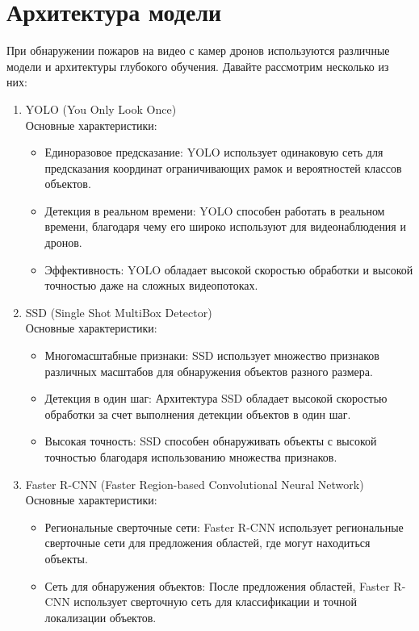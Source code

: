     \section{Архитектура модели}
    При обнаружении пожаров на видео с камер дронов используются различные модели и архитектуры глубокого обучения. Давайте рассмотрим несколько из них:
    \begin{enumerate}
        \item YOLO (You Only Look Once) \\
        Основные характеристики:
            \begin{itemize}
                \item Единоразовое предсказание: YOLO использует одинаковую сеть для предсказания координат ограничивающих рамок и вероятностей классов объектов.
                \item Детекция в реальном времени: YOLO способен работать в реальном времени, благодаря чему его широко используют для видеонаблюдения и дронов.
                \item Эффективность: YOLO обладает высокой скоростью обработки и высокой точностью даже на сложных видеопотоках.
            \end{itemize}
        \item SSD (Single Shot MultiBox Detector) \\
        Основные характеристики:
            \begin{itemize}
                \item Многомасштабные признаки: SSD использует множество признаков различных масштабов для обнаружения объектов разного размера.
                \item Детекция в один шаг: Архитектура SSD обладает высокой скоростью обработки за счет выполнения детекции объектов в один шаг.
                \item Высокая точность: SSD способен обнаруживать объекты с высокой точностью благодаря использованию множества признаков.
            \end{itemize}
        \item Faster R-CNN (Faster Region-based Convolutional Neural Network) \\
        Основные характеристики:
            \begin{itemize}
                \item Региональные сверточные сети: Faster R-CNN использует региональные сверточные сети для предложения областей, где могут находиться объекты.
                \item Сеть для обнаружения объектов: После предложения областей, Faster R-CNN использует сверточную сеть для классификации и точной локализации объектов.

\end{itemize}
\end{enumerate}
